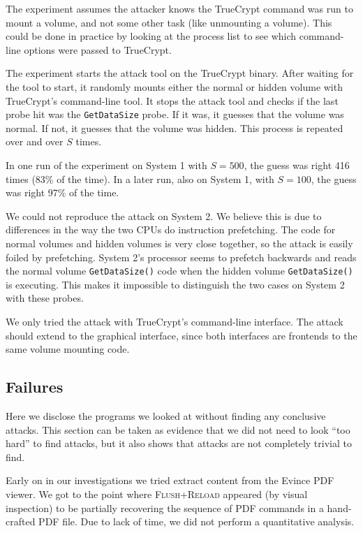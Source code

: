 \documentclass[letterpaper,twocolumn,10pt]{article}
\begin{document}
The experiment assumes the attacker knows the TrueCrypt command was run to mount
a volume, and not some other task (like unmounting a volume). This could be done
in practice by looking at the process list to see which command-line options
were passed to TrueCrypt.

The experiment starts the attack tool on the TrueCrypt binary. After waiting for
the tool to start, it randomly mounts either the normal or hidden volume with
TrueCrypt's command-line tool. It stops the attack tool and checks if the last
probe hit was the \texttt{GetDataSize} probe. If it was, it guesses that the
volume was normal. If not, it guesses that the volume was hidden. This process
is repeated over and over $S$ times.

In one run of the experiment on System 1 with
$S=500$, the guess was right 416 times (83\% of the time). In a later
run, also on System 1, with $S=100$, the guess was
right 97\% of the time.

We could not reproduce the attack on System 2. We believe this is due to
differences in the way the two CPUs do instruction prefetching. The code for
normal volumes and hidden volumes is very close together, so the attack is
easily foiled by prefetching. System 2's processor seems to prefetch backwards
and reads the normal volume \texttt{GetDataSize()} code when the hidden volume
\texttt{GetDataSize()} is executing. This makes it impossible to distinguish the
two cases on System 2 with these probes.

We only tried the attack with TrueCrypt's command-line interface. The attack
should extend to the graphical interface, since both interfaces are frontends to
the same volume mounting code. 

\subsection{Failures}
\label{sec:failures}

Here we disclose the programs we looked at without finding any conclusive
attacks. This section can be taken as evidence that we did not need to look
``too hard'' to find attacks, but it also shows that attacks are not completely
trivial to find.

Early on in our investigations we tried extract content from the Evince PDF
viewer. We got to the point where \textsc{Flush+Reload} appeared (by visual
inspection) to be partially recovering the sequence of PDF commands in
a hand-crafted PDF file. Due to lack of time, we did not perform a quantitative
analysis. 
\end{document}
